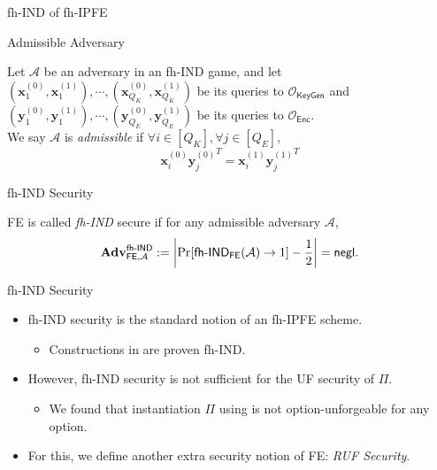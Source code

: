 \begin{frame}{fh-IND of fh-IPFE}

\begin{definition}{Admissible Adversary}

	Let $\mathcal{A}$ be an adversary in an \textsf{fh-IND} game, and let $ (\mathbf{x}_1^{(0)}, \mathbf{x}_1^{(1)}), \cdots, (\mathbf{x}_{Q_K}^{(0)}, \mathbf{x}_{Q_K}^{(1)})$ be its queries to $\mathcal{O}_{\textsf{KeyGen}}$ and $(\mathbf{y}_1^{(0)}, \mathbf{y}_1^{(1)}), \cdots, (\mathbf{y}_{Q_E}^{(0)}, \mathbf{y}_{Q_E}^{(1)})$ be its queries to $\mathcal{O}_{\textsf{Enc}}$.\pause \\
	\medskip
	We say $\mathcal{A}$ is \emph{admissible} if $\forall i \in [Q_K], \forall j \in [Q_E]$,
\[
	{\mathbf{x}^{(0)}_{i}} {\mathbf{y}^{(0)}_{j}}^T = {\mathbf{x}^{(1)}_{i}} {\mathbf{y}^{(1)}_{j}}^T
\]

\end{definition}
\pause

\begin{definition}{fh-IND Security}

	\textsf{FE} is called \emph{fh-IND} secure if for any admissible adversary $\mathcal{A}$, 
	\[
		\mathbf{Adv}_{\textsf{FE}, \mathcal{A}}^{\textsf{fh-IND}} := \left| \Pr[\textsf{fh-IND}_{\textsf{FE}}(\mathcal{A}) \to 1 ] - \frac{1}{2} \right| = \mathsf{negl}.
	\]

\end{definition}

\end{frame}


\begin{frame}{fh-IND Security}

\begin{itemize}
	
	\item<1-> fh-IND security is the standard notion of an fh-IPFE scheme.
	\begin{itemize}
		\item Constructions in \cite{cryptoeprint:2015/1255, 10.1007/978-3-319-45871-7_24, cryptoeprint:2016/440} are proven fh-IND.
	\end{itemize}

	\item<2-> However, fh-IND security is not sufficient for the UF security of $\Pi$.
	\begin{itemize}
		\item We found that instantiation $\Pi$ using \cite{cryptoeprint:2016/440} is not \textsf{option}-unforgeable for any \textsf{option}.
	\end{itemize}

	\item<3-> For this, we define another extra security notion of \textsf{FE}: \emph{RUF Security}.

\end{itemize}

\end{frame}


